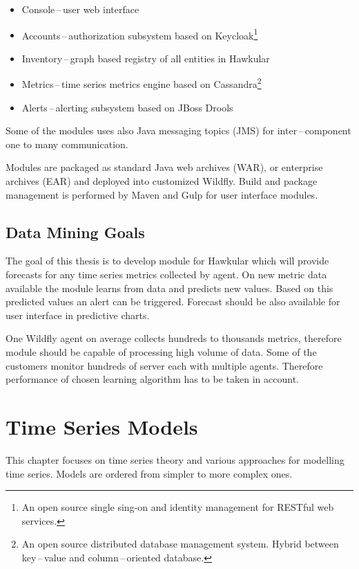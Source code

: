     \begin{itemize}
        \item Console\,--\,user web interface
        \item Accounts\,--\,authorization subsystem based on Keycloak\footnote{An open
            source single sing-on and identity management for RESTful web services.}
        \item Inventory\,--\,graph based registry of all entities in Hawkular
        \item Metrics\,--\,time series metrics engine based on Cassandra\footnote{An open
            source distributed database management system. Hybrid between key\,--\,value and
        column\,--\,oriented database.}
        \item Alerts\,--\,alerting subsystem based on JBoss Drools
    \end{itemize}

    Some of the modules uses also Java messaging topics (JMS) for inter\,--\,component
    one to many communication.

    Modules are packaged as standard Java web archives (WAR), or enterprise archives (EAR)
    and deployed into customized Wildfly. Build and package management is performed by 
    Maven and Gulp for user interface modules. 

    \section{Data Mining Goals}
    The goal of this thesis is to develop module for Hawkular which will provide forecasts for any 
    time series metrics collected by agent. On new metric data available the module
    learns from data and predicts new values. Based on this predicted values an alert can
    be triggered. Forecast should be also available for user interface in predictive
    charts. 

    One Wildfly agent on average collects hundreds to thousands metrics, therefore module
    should be capable of processing high volume of data. Some of the customers monitor
    hundreds of server each with multiple agents. Therefore performance of chosen 
    learning algorithm has to be taken in account.

\chapter{Time Series Models} \label{models}
This chapter focuses on time series theory and various approaches for modelling time series.
Models are ordered from simpler to more complex ones. 

